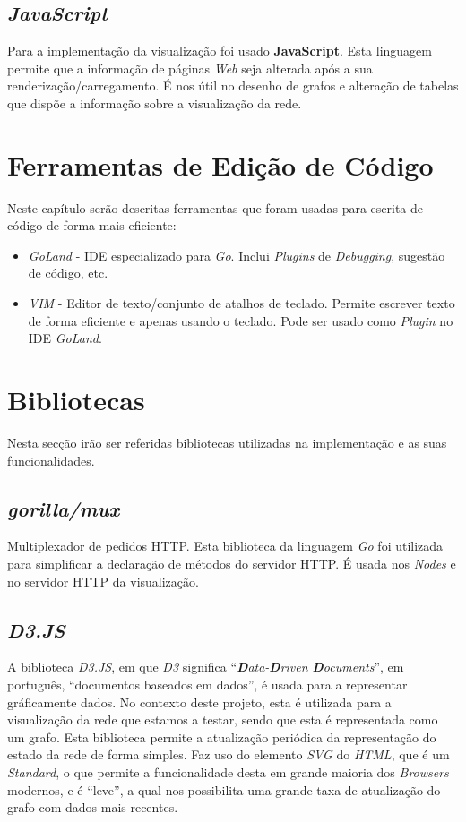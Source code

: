 \subsection{\emph{JavaScript}}
Para a implementação da visualização foi usado \textbf{JavaScript}.
Esta linguagem permite que a informação de páginas \emph{Web} seja alterada após a sua renderização/carregamento.
É nos útil no desenho de grafos e alteração de tabelas que dispõe a informação sobre a visualização da rede.



\section{Ferramentas de Edição de Código}
Neste capítulo serão descritas ferramentas que foram usadas para escrita de código de forma mais eficiente:
\begin{itemize}
    \item \emph{GoLand} - \acs{IDE} especializado para \emph{Go}. Inclui \emph{Plugins} de \emph{Debugging}, sugestão de código, etc.
    \item \emph{\acs{VIM}} - Editor de texto/conjunto de atalhos de teclado. Permite escrever texto de forma eficiente e apenas usando o teclado. Pode ser usado como \emph{Plugin} no \acs{IDE} \emph{GoLand}.
\end{itemize}

\section{Bibliotecas}
\label{chap3:bibliotecas}
Nesta secção irão ser referidas bibliotecas utilizadas na implementação e as suas funcionalidades.

\subsection{\emph{gorilla/mux}}
Multiplexador de pedidos \acs{HTTP}. Esta biblioteca da linguagem \emph{Go} foi utilizada para simplificar a declaração de métodos do servidor \acs{HTTP}. É usada nos \emph{Nodes} e no servidor \acs{HTTP} da visualização.

\subsection{\emph{D3.JS}}
A biblioteca \emph{D3.JS}, em que \emph{D3} significa ``\emph{\textbf{D}ata-\textbf{D}riven \textbf{D}ocuments}'', em português, ``documentos baseados em dados'', é usada para a representar gráficamente dados.
No contexto deste projeto, esta é utilizada para a visualização da rede que estamos a testar, sendo que esta é representada como um grafo.
Esta biblioteca permite a atualização periódica da representação do estado da rede de forma simples.
Faz uso do elemento \emph{\acs{SVG}} do \emph{\acs{HTML}}, que é um \emph{Standard}, o que permite a funcionalidade desta em grande maioria dos \emph{Browsers} modernos, e é ``leve'', a qual nos possibilita uma grande taxa de atualização do grafo com dados mais recentes.


